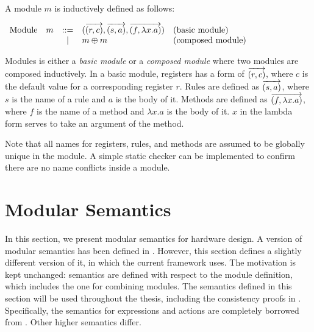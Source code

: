 \begin{definition}
  \label{def-module}
  A module $m$ is inductively defined as follows:
  \begin{center}
    \begin{math}
      \begin{array}{rcll}
        \textrm{Module}\quad m & ::=
        & (\overrightarrow{(r, c)}, \overrightarrow{(s, a)}, \overrightarrow{(f, \lambda x.a)})
        & \textrm{(basic module)} \\
        & | & m \oplus m & \textrm{(composed module)}
      \end{array}
    \end{math}
  \end{center}
\end{definition}

Modules is either a \emph{basic module} or a \emph{composed module}
where two modules are composed inductively. In a basic module,
registers has a form of $\overrightarrow{(r, c)}$, where $c$ is the
default value for a corresponding register $r$. Rules are defined as
$\overrightarrow{(s, a)}$, where $s$ is the name of a rule and $a$ is
the body of it. Methods are defined as $\overrightarrow{(f, \lambda
    x.a)}$, where $f$ is the name of a method and $\lambda x.a$ is the
body of it. $x$ in the lambda form serves to take an argument of the
method.

Note that all names for registers, rules, and methods are assumed to
be globally unique in the module. A simple static checker can be
implemented to confirm there are no name conflicts inside a module.

\section{Modular Semantics}
\label{sec-semmod}

In this section, we present modular semantics for hardware design. A
version of modular semantics has been defined in \cite{murali-thesis}.
However, this section defines a slightly different version of it, in
which the current \Kami{} framework uses. The motivation is kept
unchanged: semantics are defined with respect to the module
definition, which includes the one for combining modules. The
semantics defined in this section will be used throughout the thesis,
including the consistency proofs in . Specifically, the
semantics for expressions and actions are completely borrowed from
\cite{murali-thesis}. Other higher semantics differ.

